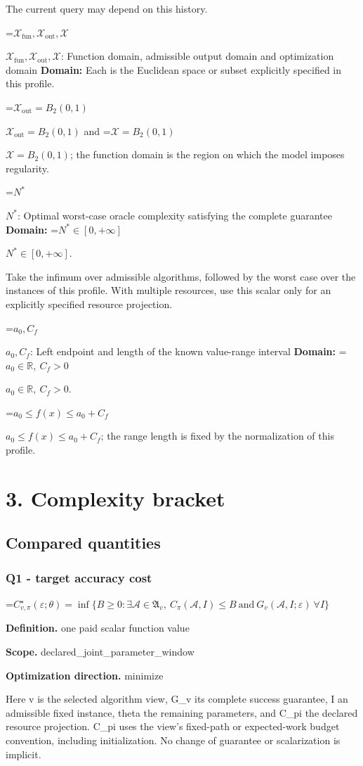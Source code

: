 \documentclass[10pt,a4paper]{article}
\newcommand{\AtlasMath}[1]{\par\begingroup\centering\setbox0=\hbox{$\displaystyle #1$}\ifdim\wd0>1.4\linewidth\typeout{ATLAS WIDE FORMULA: \the\wd0}\fi\ifdim\wd0>\linewidth\resizebox{\linewidth}{!}{\box0}\else\box0\fi\par\endgroup}
\newcommand{\AtlasInlineMath}[1]{\begingroup\setbox0=\hbox{$#1$}\ifdim\wd0>.4\linewidth\endgroup\AtlasMath{#1}\else\endgroup$#1$\fi}
\begin{document}
The current query may depend on this history.

\AtlasInlineMath{\mathcal{X}_{\mathrm{fun}},\mathcal{X}_{\mathrm{out}},\mathcal{X}}: Function domain, admissible output domain and optimization domain \textbf{Domain:} Each is the Euclidean space or subset explicitly specified in this profile.

\AtlasInlineMath{\mathcal{X}_{\mathrm{out}}=B_2(0,1)} and \AtlasInlineMath{\mathcal{X}=B_2(0,1)}; the function domain is the region on which the model imposes regularity.

\AtlasInlineMath{N^*}: Optimal worst-case oracle complexity satisfying the complete guarantee \textbf{Domain:} \AtlasInlineMath{N^*\in[0,+\infty]}.

Take the infimum over admissible algorithms, followed by the worst case over the instances of this profile. With multiple resources, use this scalar only for an explicitly specified resource projection.

\AtlasInlineMath{a_0,C_f}: Left endpoint and length of the known value-range interval \textbf{Domain:} \AtlasInlineMath{a_0\in\mathbb{R},\ C_f>0}.

\AtlasInlineMath{a_0\le f(x)\le a_0+C_f}; the range length is fixed by the normalization of this profile.

\section{3. Complexity bracket}
\subsection{Compared quantities}
\subsubsection{Q1 - target accuracy cost}
\AtlasMath{C^\star_{v,\pi}(\varepsilon;\theta)=\inf\{B\ge0:\exists\mathcal A\in\mathfrak A_v,\ C_\pi(\mathcal A,I)\le B\ \text{and}\ G_v(\mathcal A,I;\varepsilon)\ \forall I\}}
\textbf{Definition.} one paid scalar function value

\textbf{Scope.} declared\_joint\_parameter\_window

\textbf{Optimization direction.} minimize

Here v is the selected algorithm view, G\_v its complete success guarantee, I an admissible fixed instance, theta the remaining parameters, and C\_pi the declared resource projection. C\_pi uses the view's fixed-path or expected-work budget convention, including initialization. No change of guarantee or scalarization is implicit.
\end{document}
